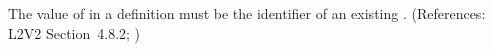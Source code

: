The value of  in a \Species definition must be the
identifier of an existing \SpeciesType.  (References: L2V2
Section~4.8.2; )
